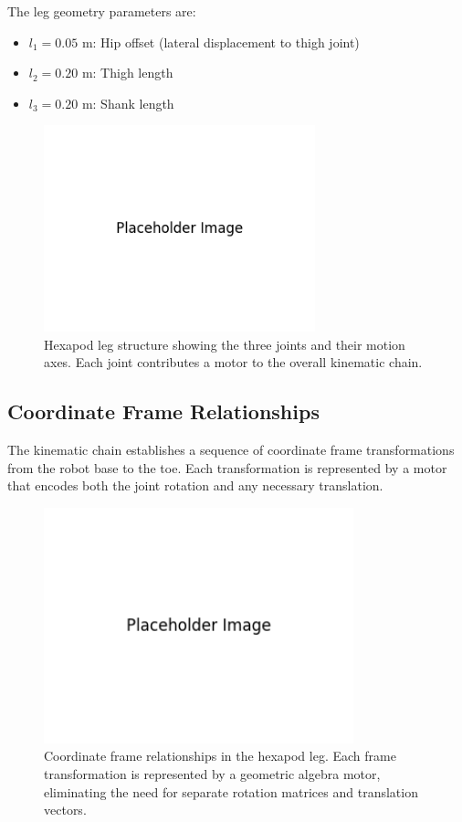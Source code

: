 \documentclass[11pt]{article}
\begin{document}
The leg geometry parameters are:
\begin{itemize}
    \item $l_1 = 0.05$ m: Hip offset (lateral displacement to thigh joint)
    \item $l_2 = 0.20$ m: Thigh length
    \item $l_3 = 0.20$ m: Shank length  
\end{itemize}

\begin{figure}[H]
    \centering
    \includegraphics[width=0.7\textwidth]{illustrations/hexapod_leg_structure.png}
    \caption{Hexapod leg structure showing the three joints and their motion axes. Each joint contributes a motor to the overall kinematic chain.}
    \label{fig:leg_structure}
\end{figure}

\subsection{Coordinate Frame Relationships}

The kinematic chain establishes a sequence of coordinate frame transformations from the robot base to the toe. Each transformation is represented by a motor that encodes both the joint rotation and any necessary translation.

\begin{figure}[H]
    \centering
    \includegraphics[width=0.8\textwidth]{illustrations/coordinate_frames.png}
    \caption{Coordinate frame relationships in the hexapod leg. Each frame transformation is represented by a geometric algebra motor, eliminating the need for separate rotation matrices and translation vectors.}
    \label{fig:coordinate_frames}
\end{figure}
\end{document}

